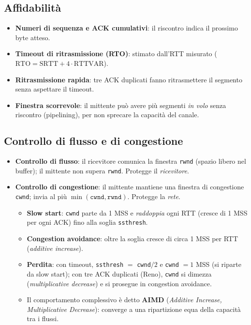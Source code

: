 \subsection{Affidabilità}
\begin{itemize}
    \item \textbf{Numeri di sequenza e ACK cumulativi}: il riscontro indica il prossimo byte atteso.
    \item \textbf{Timeout di ritrasmissione (RTO)}: stimato dall'RTT misurato ($\text{RTO} = \text{SRTT} + 4\cdot\text{RTTVAR}$).
    \item \textbf{Ritrasmissione rapida}: tre ACK duplicati fanno ritrasmettere il segmento senza aspettare il timeout.
    \item \textbf{Finestra scorrevole}: il mittente può avere più segmenti \emph{in volo} senza riscontro (pipelining), per non sprecare la capacità del canale.
\end{itemize}

\subsection{Controllo di flusso e di congestione}
\begin{itemize}
    \item \textbf{Controllo di flusso}: il ricevitore comunica la finestra \texttt{rwnd} (spazio libero nel buffer); il mittente non supera \texttt{rwnd}. Protegge il \emph{ricevitore}.
    \item \textbf{Controllo di congestione}: il mittente mantiene una finestra di congestione \texttt{cwnd}; invia al più $\min(\texttt{cwnd}, \texttt{rwnd})$. Protegge la \emph{rete}.
    \begin{itemize}
        \item \textbf{Slow start}: \texttt{cwnd} parte da 1 MSS e \emph{raddoppia} ogni RTT (cresce di 1 MSS per ogni ACK) fino alla soglia \texttt{ssthresh}.
        \item \textbf{Congestion avoidance}: oltre la soglia cresce di circa 1 MSS per RTT (\emph{additive increase}).
        \item \textbf{Perdita}: con timeout, \texttt{ssthresh} $=$ \texttt{cwnd}$/2$ e \texttt{cwnd} $=1$ MSS (si riparte da slow start); con tre ACK duplicati (Reno), \texttt{cwnd} si dimezza (\emph{multiplicative decrease}) e si prosegue in congestion avoidance.
        \item Il comportamento complessivo è detto \textbf{AIMD} (\emph{Additive Increase, Multiplicative Decrease}): converge a una ripartizione equa della capacità tra i flussi.
    \end{itemize}
\end{itemize}


